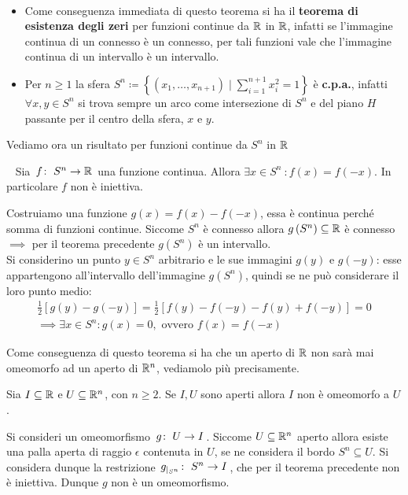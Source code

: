 \begin{observe}~{}\label{teorema esistenza zeri funzioni continue, s^n cpa}
		\begin{itemize}
	\item Come conseguenza immediata di questo teorema si ha il \textbf{teorema di esistenza degli zeri} per funzioni continue da $\mathbb{R}$ in $\mathbb{R}$, infatti se l'immagine continua di un connesso è un connesso, per tali funzioni vale che l'immagine continua di un intervallo è un intervallo.
	\item Per $n\geq 1$ la sfera $\displaystyle S^n \coloneqq \left\{ \left(x_1,\dots,x_{n+1}\right) \mid \sum_{i=1}^{n+1}x_i^2=1 \right\}$ è \textbf{c.p.a.}, infatti $\forall x,y\in S^n$ si trova sempre un arco come intersezione di $S^n$ e del piano $H$ passante per il centro della sfera, $x$ e $y$.
		\end{itemize}
\end{observe}
Vediamo ora un risultato per funzioni continue da $S^n$ in $\mathbb{R}$
\begin{theorema}~{}\label{non iniettività S^n in realset}
	Sia $\funz f {S^n} \realset$ una funzione continua. Allora $\exists x\in S^n \ \colon f(x)=f(-x)$. In particolare $f$ non è iniettiva.
\end{theorema}
\begin{demonstration}
	Costruiamo una funzione $g(x)=f(x)-f(-x)$, essa è continua perché somma di funzioni continue. Siccome $S^n$ è connesso allora $g\left( S^n\right)\subseteq\mathbb{R}$ è connesso $\implies$ per il teorema precedente $g\left(S^n\right)$ è un intervallo.\\
	Si considerino un punto $y\in S^n$ arbitrario e le sue immagini $g(y)$ e $g(-y)$: esse appartengono all'intervallo dell'immagine $g\left( S^n\right)$, quindi se ne può considerare il loro punto medio:
		\begin{gather*}
			\frac{1}{2}\left[ g(y) - g(-y)\right]=\frac{1}{2} \left[ f(y) -f(-y) - f(y) +f(-y) \right]= 0\\
			\implies \exists x\in S^n \colon g(x)=0, \text{ ovvero } f(x)=f(-x)
		\end{gather*}
\end{demonstration}
Come conseguenza di questo teorema si ha che un aperto di $\mathbb{R}$ non sarà mai omeomorfo ad un aperto di $\mathbb{R}^n$, vediamolo più precisamente.
\begin{theorema}
Sia $I\subseteq\mathbb{R}$ e $U\subseteq\mathbb{R}^n$, con $n\geq 2$. Se $I,U$ sono aperti allora $I$ non è omeomorfo a $U$.	
\end{theorema}	
\begin{demonstration}
	Si consideri un omeomorfismo $\funz g U I$. Siccome $U\subseteq\mathbb{R}^n$ aperto allora esiste una palla aperta di raggio $\epsilon$ contenuta in $U$, se ne considera il bordo $S^n\subseteq U$. Si considera dunque la restrizione $\funz {g_{|_{S^n}}} {S^n} I$, che per il teorema precedente non è iniettiva. Dunque $g$ non è un omeomorfismo.	
\end{demonstration}

